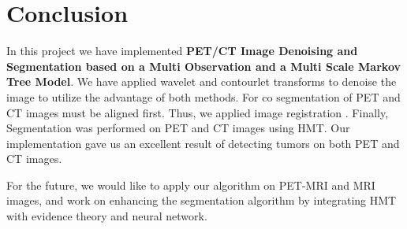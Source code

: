 \chapter{Conclusion}
\label{chap:conclusion}

In this project we have implemented \textbf{PET/CT Image Denoising and Segmentation based on a Multi Observation and a Multi Scale Markov Tree Model}. We have applied wavelet and contourlet transforms to denoise the image to utilize the advantage of both methods. For co segmentation of PET and CT images must be aligned first. Thus, we applied image registration . Finally, Segmentation was performed on PET and CT images using HMT. Our implementation gave us an excellent result of detecting tumors on both PET and CT images.

For the future, we would like to apply our algorithm on PET-MRI and MRI images, and work on enhancing the segmentation algorithm by integrating HMT  with evidence theory and neural network.